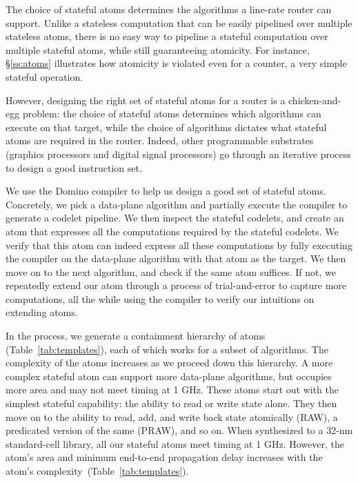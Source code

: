 The choice of stateful atoms determines the algorithms a line-rate router can
support. Unlike a stateless computation that can be easily pipelined over
multiple stateless atoms, there is no easy way to pipeline a stateful
computation over multiple stateful atoms, while still guaranteeing atomicity.
For instance, \S\ref{ss:atoms} illustrates how atomicity is violated even for a
counter, a very simple stateful operation.

However, designing the right set of stateful atoms for a router is a
chicken-and-egg problem: the choice of stateful atoms determines which
algorithms can execute on that target, while the choice of algorithms dictates
what stateful atoms are required in the router. Indeed, other programmable
substrates (\eg graphics processors and digital signal processors) go through
an iterative process to design a good instruction set.

 We use the Domino compiler to help us design a good set of stateful atoms.
Concretely, we pick a data-plane algorithm and partially execute the
\pktlanguage compiler to generate a codelet pipeline.  We then inspect the
stateful codelets, and create an atom that expresses all the computations
required by the stateful codelets. We verify that this atom can indeed express
all these computations by fully executing the compiler on the data-plane
algorithm with that atom as the target. We then move on to the next algorithm,
and check if the same atom suffices. If not, we repeatedly extend our atom
through a process of trial-and-error to capture more computations, all the
while using the compiler to verify our intuitions on extending atoms.

In the process, we generate a containment hierarchy of atoms
(Table~\ref{tab:templates}), each of which works for a subset of algorithms.
The complexity of the atoms increases as we proceed down this hierarchy. A more
complex stateful atom can support more data-plane algorithms, but occupies more
area and may not meet timing at 1 GHz. These atoms start out with the simplest
stateful capability: the ability to read or write state alone.  They then move
on to the ability to read, add, and write back state atomically (RAW), a
predicated version of the same (PRAW), and so on. When synthesized to a 32-nm
standard-cell library, all our stateful atoms meet timing at 1 GHz.  However,
the atom's area and minimum end-to-end propagation delay increases with the
atom's complexity~(Table~\ref{tab:templates}).

